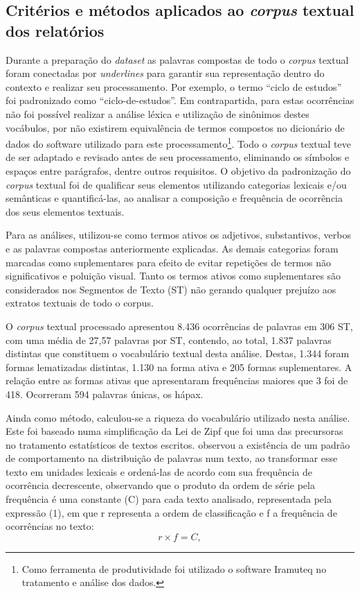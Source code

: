 \documentclass{textolivre-html}
\begin{document}
\subsection{Critérios e métodos aplicados ao \textit{corpus} textual dos relatórios}\label{sec-criterios}
Durante a preparação do \textit{dataset} as palavras compostas de todo o \textit{corpus} textual foram conectadas por \textit{underlines} para garantir sua representação dentro do contexto e realizar seu processamento. Por exemplo, o termo “ciclo de estudos” foi padronizado como “ciclo-de-estudos”. Em contrapartida, para estas ocorrências não foi possível realizar a análise léxica e utilização de sinônimos destes vocábulos, por não existirem equivalência de termos compostos no dicionário de dados do software utilizado para este processamento\footnote{Como ferramenta de produtividade foi utilizado o software Iramuteq no tratamento e análise dos dados.}. 
Todo o \textit{corpus} textual teve de ser adaptado e revisado antes de seu processamento, eliminando os símbolos e espaços entre parágrafos, dentre outros requisitos. O objetivo da padronização do \textit{corpus} textual foi de qualificar seus elementos utilizando categorias lexicais e/ou semânticas e quantificá-las, ao analisar a composição e frequência de ocorrência dos seus elementos textuais.

Para as análises, utilizou-se como termos ativos os adjetivos, substantivos, verbos e as palavras compostas anteriormente explicadas. As demais categorias foram marcadas como suplementares para efeito de evitar repetições de termos não significativos e poluição visual. Tanto os termos ativos como suplementares são considerados nos Segmentos de Texto (ST) não gerando qualquer prejuízo aos extratos textuais de todo o corpus.  

O \textit{corpus} textual processado apresentou 8.436 ocorrências de palavras em 306 ST, com uma média de 27,57 palavras por ST, contendo, ao total, 1.837 palavras distintas que constituem o vocabulário textual desta análise. Destas, 1.344 foram formas lematizadas distintas, 1.130 na forma ativa e 205 formas suplementares. A relação entre as formas ativas que apresentaram frequências maiores que 3 foi de 418. Ocorreram 594 palavras únicas, os hápax.

Ainda como método, calculou-se a riqueza do vocabulário utilizado nesta análise. Este foi baseado numa simplificação da Lei de Zipf \cite{booth1967,zipf1949} que foi uma das precursoras no tratamento estatísticos de textos escritos. \textcite{zipf1949} observou a existência de um padrão de comportamento na distribuição de palavras num texto, ao transformar esse texto em unidades lexicais e ordená-las de acordo com sua frequência de ocorrência decrescente, observando que o produto da ordem de série pela frequência é uma constante (C) para cada texto analisado, representada pela expressão (1), em que r representa a ordem de classificação e f a frequência de ocorrências no texto:
\begin{equation}
r \times f = C,
\end{equation}
\end{document}
